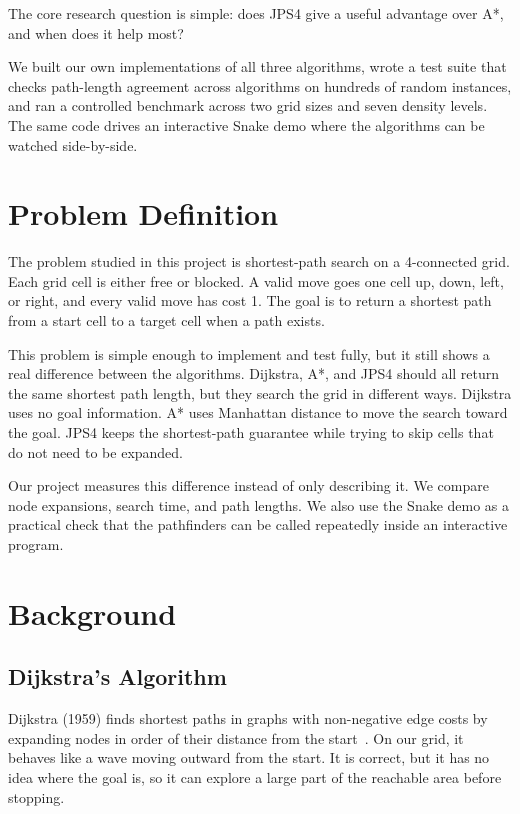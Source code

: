 \documentclass[11pt,a4paper]{article}
\begin{document}
The core research question is simple: does JPS4 give a useful advantage over A*, and when does it help most?

We built our own implementations of all three algorithms, wrote a test suite that checks path-length agreement across algorithms on hundreds of random instances, and ran a controlled benchmark across two grid sizes and seven density levels. The same code drives an interactive Snake demo where the algorithms can be watched side-by-side.

\section{Problem Definition}

The problem studied in this project is shortest-path search on a 4-connected grid. Each grid cell is either free or blocked. A valid move goes one cell up, down, left, or right, and every valid move has cost 1. The goal is to return a shortest path from a start cell to a target cell when a path exists.

This problem is simple enough to implement and test fully, but it still shows a real difference between the algorithms. Dijkstra, A*, and JPS4 should all return the same shortest path length, but they search the grid in different ways. Dijkstra uses no goal information. A* uses Manhattan distance to move the search toward the goal. JPS4 keeps the shortest-path guarantee while trying to skip cells that do not need to be expanded.

Our project measures this difference instead of only describing it. We compare node expansions, search time, and path lengths. We also use the Snake demo as a practical check that the pathfinders can be called repeatedly inside an interactive program.

\section{Background}

\subsection{Dijkstra's Algorithm}

Dijkstra (1959) finds shortest paths in graphs with non-negative edge costs by expanding nodes in order of their distance from the start~\cite{dijkstra1959}. On our grid, it behaves like a wave moving outward from the start. It is correct, but it has no idea where the goal is, so it can explore a large part of the reachable area before stopping.
\end{document}
